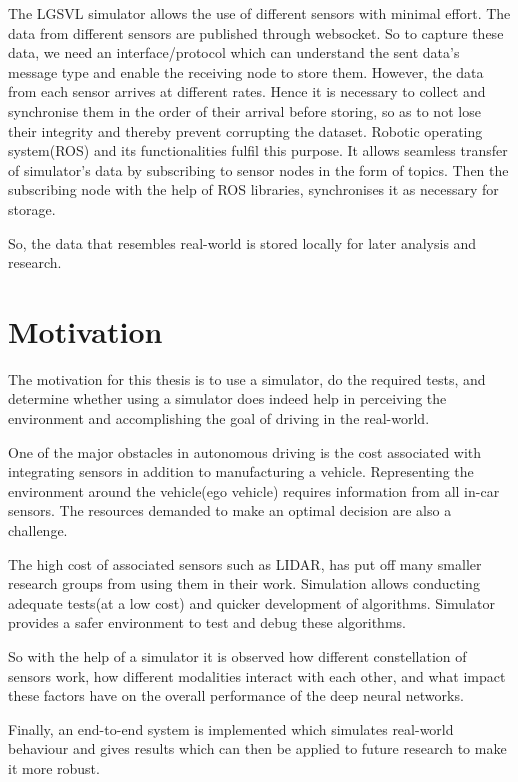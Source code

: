 The LGSVL simulator allows the use of different sensors with minimal effort. The data
from different sensors are published through websocket. So to capture these data, we
need an interface/protocol which can understand the sent data's message type and enable the
receiving node to store them. However, the data from each sensor arrives at
different rates. Hence it is necessary to collect and synchronise them in the order of their arrival
before storing, so as to not lose their integrity and thereby prevent corrupting the dataset.
Robotic operating system(ROS) \cite{ROS2} and its functionalities fulfil
this purpose. It allows seamless transfer of simulator's data by subscribing to sensor
nodes in the form of topics. Then the subscribing node with the help of ROS libraries, synchronises it as necessary for storage.

So, the data that resembles real-world is stored locally for later analysis and
research.


\section{Motivation}

The motivation for this thesis is to use a simulator, do the required tests, and
determine whether using a simulator does indeed help in perceiving the environment
and accomplishing the goal of driving in the real-world.

One of the major obstacles in autonomous driving is the cost associated with integrating
sensors in addition to manufacturing a vehicle. Representing the environment around the vehicle(ego vehicle) requires information from all in-car sensors.
The resources demanded to make an optimal decision are also a challenge.

The high cost of associated sensors such as LIDAR\cite{mesarticleonLidar}, has put off many smaller research groups from using them
in their work. Simulation allows conducting adequate tests(at a low cost) and quicker
development of algorithms. Simulator provides a safer environment to test and debug these
algorithms.

So with the help of a simulator it is observed how different constellation of sensors work, how different modalities interact with
each other, and what impact these factors have on the overall performance of the deep
neural networks.

Finally, an end-to-end system is implemented which simulates real-world behaviour and gives
results which can then be applied to future research to make it more robust.

